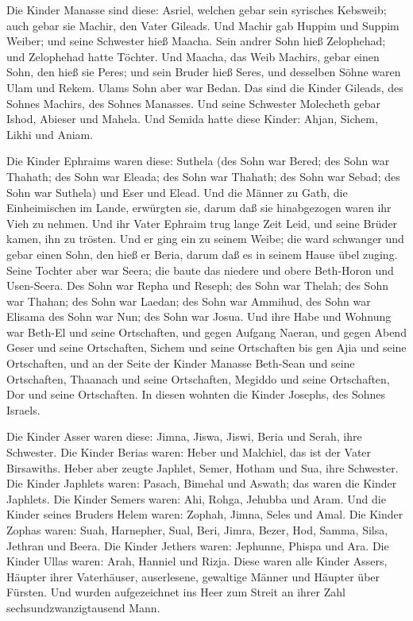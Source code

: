  Die Kinder Manasse sind diese: Asriel, welchen gebar sein
syrisches Kebsweib; auch gebar sie Machir, den Vater Gileads.
 Und Machir gab Huppim und Suppim Weiber; und seine
Schwester hieß Maacha. Sein andrer Sohn hieß Zelophehad; und Zelophehad
hatte Töchter.  Und Maacha, das Weib Machirs, gebar einen
Sohn, den hieß sie Peres; und sein Bruder hieß Seres, und desselben
Söhne waren Ulam und Rekem.  Ulams Sohn aber war Bedan. Das
sind die Kinder Gileads, des Sohnes Machirs, des Sohnes Manasses.
 Und seine Schwester Molecheth gebar Ishod, Abieser und
Mahela.  Und Semida hatte diese Kinder: Ahjan, Sichem,
Likhi und Aniam.

 Die Kinder Ephraims waren diese: Suthela (des Sohn war
Bered; des Sohn war Thahath; des Sohn war Eleada; des Sohn war Thahath;
 des Sohn war Sebad; des Sohn war Suthela) und Eser und
Elead. Und die Männer zu Gath, die Einheimischen im Lande, erwürgten
sie, darum daß sie hinabgezogen waren ihr Vieh zu nehmen. 
Und ihr Vater Ephraim trug lange Zeit Leid, und seine Brüder kamen, ihn
zu trösten.  Und er ging ein zu seinem Weibe; die ward
schwanger und gebar einen Sohn, den hieß er Beria, darum daß es in
seinem Hause übel zuging.  Seine Tochter aber war Seera;
die baute das niedere und obere Beth-Horon und Usen-Seera. 
Des Sohn war Repha und Reseph; des Sohn war Thelah; des Sohn war Thahan;
 des Sohn war Laedan; des Sohn war Ammihud, des Sohn war
Elisama  des Sohn war Nun; des Sohn war Josua.
 Und ihre Habe und Wohnung war Beth-El und seine
Ortschaften, und gegen Aufgang Naeran, und gegen Abend Geser und seine
Ortschaften, Sichem und seine Ortschaften bis gen Ajia und seine
Ortschaften,  und an der Seite der Kinder Manasse Beth-Sean
und seine Ortschaften, Thaanach und seine Ortschaften, Megiddo und seine
Ortschaften, Dor und seine Ortschaften. In diesen wohnten die Kinder
Josephs, des Sohnes Israels.

 Die Kinder Asser waren diese: Jimna, Jiswa, Jiswi, Beria
und Serah, ihre Schwester.  Die Kinder Berias waren: Heber
und Malchiel, das ist der Vater Birsawiths.  Heber aber
zeugte Japhlet, Semer, Hotham und Sua, ihre Schwester.  Die
Kinder Japhlets waren: Pasach, Bimehal und Aswath; das waren die Kinder
Japhlets.  Die Kinder Semers waren: Ahi, Rohga, Jehubba und
Aram.  Und die Kinder seines Bruders Helem waren: Zophah,
Jimna, Seles und Amal.  Die Kinder Zophas waren: Suah,
Harnepher, Sual, Beri, Jimra,  Bezer, Hod, Samma, Silsa,
Jethran und Beera.  Die Kinder Jethers waren: Jephunne,
Phispa und Ara.  Die Kinder Ullas waren: Arah, Hanniel und
Rizja.  Diese waren alle Kinder Assers, Häupter ihrer
Vaterhäuser, auserlesene, gewaltige Männer und Häupter über Fürsten. Und
wurden aufgezeichnet ins Heer zum Streit an ihrer Zahl
sechsundzwanzigtausend Mann.

